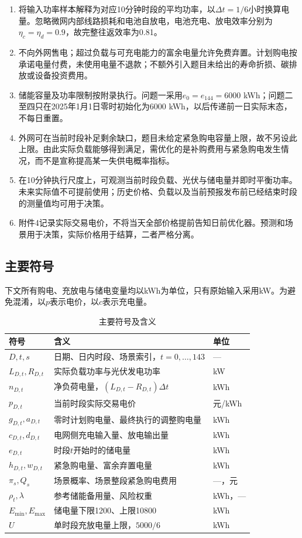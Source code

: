 \begin{enumerate}
  \item 将输入功率样本解释为对应10分钟时段的平均功率，以$\Delta t=1/6$小时换算电量。忽略微网内部线路损耗和电池自放电，电池充电、放电效率分别为$\eta_c=\eta_d=0.9$，故完整往返效率为0.81。
  \item 不向外网售电；超过负载与可充电能力的富余电量允许免费弃置。计划购电按承诺电量付费，未使用电量不退款；不额外引入题目未给出的寿命折损、碳排放或设备投资费用。
  \item 储能容量及功率限制按附录执行。问题一采用$e_0=e_{144}=6000$ kWh；问题二至四只在2025年1月1日零时初始化为6000 kWh，以后传递前一日实际末态，不每日重置。
  \item 外网可在当前时段补足剩余缺口，题目未给定紧急购电容量上限，故不另设此上限。由此实际负载能够得到满足，需优化的是补购费用与紧急购电发生情况，而不是宣称提高某一失供电概率指标。
  \item 在10分钟执行尺度上，可观测当前时段负载、光伏与储电量并即时平衡功率。未来实际值不可提前使用；历史价格、负载以及当前预报发布前已经结束时段的测量值均可用于决策。
  \item 附件4记录实际交易电价，不将当天全部价格提前告知日前优化器。预测和场景用于决策，实际价格用于结算，二者严格分离。
\end{enumerate}

\subsection{主要符号}

下文所有购电、充放电与储电变量均以kWh为单位，只有原始输入采用kW。为避免混淆，以$p$表示电价，以$c$表示充电量。

\begin{table}[htbp]
\centering
\caption{主要符号及含义}
\label{tab:symbols}
\small
\begin{tabular}{p{}p{}p{}}
\toprule
符号 & 含义 & 单位\\
\midrule
$D,t,s$ & 日期、日内时段、场景索引，$t=0,\ldots,143$ & ---\\
$L_{D,t},R_{D,t}$ & 实际负载功率与光伏发电功率 & kW\\
$n_{D,t}$ & 净负荷电量，$(L_{D,t}-R_{D,t})\Delta t$ & kWh\\
$p_{D,t}$ & 当前时段实际交易电价 & 元/kWh\\
$g_{D,t},a_{D,t}$ & 零时计划购电量、最终执行的调整购电量 & kWh\\
$c_{D,t},d_{D,t}$ & 电网侧充电输入量、放电输出量 & kWh\\
$e_{D,t}$ & 时段$t$开始时的储电量 & kWh\\
$h_{D,t},w_{D,t}$ & 紧急购电量、富余弃置电量 & kWh\\
$\pi_s,Q_s$ & 场景概率、场景整段紧急购电费用 & ---，元\\
$\rho_t,\lambda$ & 参考储能备用量、风险权重 & kWh，---\\
$E_{\min},E_{\max}$ & 储电量下限1200、上限10800 & kWh\\
$U$ & 单时段充放电量上限，$5000/6$ & kWh\\
\bottomrule
\end{tabular}
\end{table}

